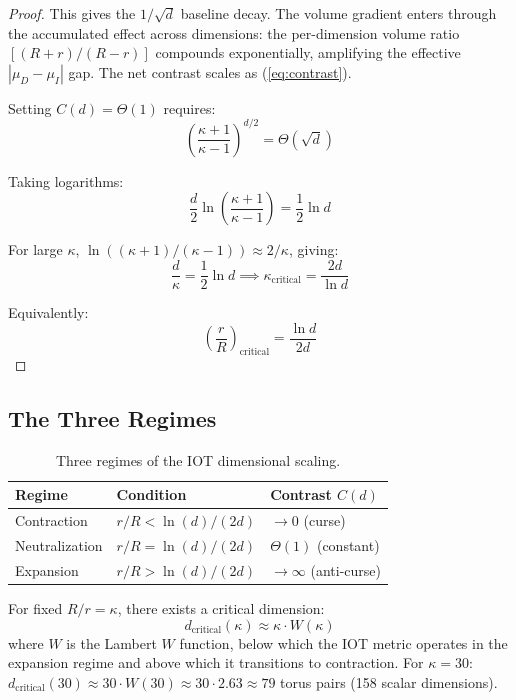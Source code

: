 \begin{proof}
This gives the $1/\sqrt{d}$ baseline decay. The volume gradient enters through the accumulated effect across dimensions: the per-dimension volume ratio $[(R+r)/(R-r)]$ compounds exponentially, amplifying the effective $|\mu_D - \mu_I|$ gap. The net contrast scales as (\ref{eq:contrast}).

Setting $C(d) = \Theta(1)$ requires:
\begin{equation}
    \left(\frac{\kappa + 1}{\kappa - 1}\right)^{d/2} = \Theta(\sqrt{d})
\end{equation}

Taking logarithms:
\begin{equation}
    \frac{d}{2} \ln\!\left(\frac{\kappa + 1}{\kappa - 1}\right) = \frac{1}{2}\ln d
\end{equation}

For large $\kappa$, $\ln((\kappa+1)/(\kappa-1)) \approx 2/\kappa$, giving:
\begin{equation}
    \frac{d}{\kappa} = \frac{1}{2} \ln d \implies \kappa_{\text{critical}} = \frac{2d}{\ln d}
\end{equation}

Equivalently:
\begin{equation}
    \boxed{\left(\frac{r}{R}\right)_{\text{critical}} = \frac{\ln d}{2d}}
    \label{eq:critical}
\end{equation}
\end{proof}

\subsection{The Three Regimes}

\begin{table}[h]
\centering
\footnotesize
\begin{tabular}{@{}lll@{}}
\toprule
Regime & Condition & Contrast $C(d)$ \\
\midrule
Contraction & $r/R < \ln(d)/(2d)$ & $\to 0$ (curse) \\
Neutralization & $r/R = \ln(d)/(2d)$ & $\Theta(1)$ (constant) \\
Expansion & $r/R > \ln(d)/(2d)$ & $\to \infty$ (anti-curse) \\
\bottomrule
\end{tabular}
\caption{Three regimes of the IOT dimensional scaling.}
\label{tab:regimes}
\end{table}

\begin{corollary}
For fixed $R/r = \kappa$, there exists a critical dimension:
\begin{equation}
    d_{\text{critical}}(\kappa) \approx \kappa \cdot W(\kappa)
\end{equation}
where $W$ is the Lambert $W$ function, below which the IOT metric operates in the expansion regime and above which it transitions to contraction. For $\kappa = 30$: $d_{\text{critical}}(30) \approx 30 \cdot W(30) \approx 30 \cdot 2.63 \approx 79$ torus pairs (158 scalar dimensions).
\end{corollary}

